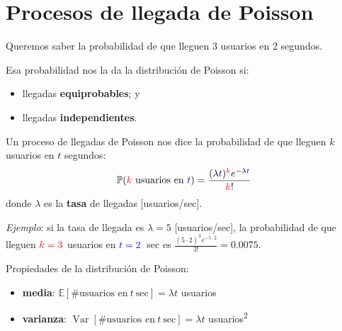 \documentclass[xcolor={x11names}]{beamer}
\DeclareMathOperator{\Var}{Var}
\newcommand{\red}[1]{{\color{red}#1}}
\newcommand{\blue}[1]{{\color{blue}#1}}
\begin{document}
\section{Procesos de llegada de Poisson}



\begin{frame}{\secname}
    \begin{figure}
        
    \end{figure}

    Queremos saber la probabilidad de que
    lleguen 3 usuarios en 2 segundos.

    Esa probabilidad nos la da la distribución
    de Poisson si:
    \begin{itemize}
        \item llegadas \textbf{equiprobables}; y
        \item llegadas \textbf{independientes}.
    \end{itemize}
\end{frame}


\begin{frame}{\secname}
    Un proceso de llegadas de Poisson nos
    dice la probabilidad de que lleguen
    $k$ usuarios en $t$ segundos:
    \begin{equation}
        \mathbb{P}(\red{k}\ \text{usuarios en}\ \blue{t})=\frac{(\lambda \blue{t})^\red{k} e^{-\lambda \blue{t} }}{\red{k}!}
        \label{eq:poisson}
    \end{equation}
    donde $\lambda$ es la \textbf{tasa}
    de llegadas [usuarios/sec].

    \vfill

    \textit{Ejemplo}: si la tasa
    de llegada es $\lambda=5$ [usuarios/sec],
    la probabilidad de
    que lleguen $\red{k=3}$ usuarios en $\blue{t=2}$~sec es
    $\tfrac{(5\cdot2)^3 e^{-5\cdot2}}{3!}=0.0075$.
\end{frame}




\begin{frame}{\secname}
    Propiedades de la distribución de Poisson:
    \begin{itemize}
        \item \textbf{media}: $\mathbb{E}[\text{\#usuarios en}\ t\ \text{sec}]=\lambda t$ usuarios
        \item \textbf{varianza}: $\Var[\text{\#usuarios en}\ t\ \text{sec}]=\lambda t$ usuarios\textsuperscript{2}
    \end{itemize}

    \begin{figure}
        
    \end{figure}
\end{frame}
\end{document}
